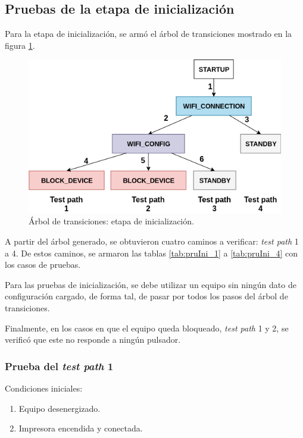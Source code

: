 \subsection{Pruebas de la etapa de inicialización}

Para la etapa de inicialización, se armó el árbol de transiciones mostrado en la figura \ref{fig:ArTrans_1}.

\begin{figure}[htpb]
	\centering
	\includegraphics[scale=1]{./Figures/ArTrans_1.png}
	\caption{Árbol de transiciones: etapa de inicialización.}
	\label{fig:ArTrans_1}
\end{figure}

A partir del árbol generado, se obtuvieron cuatro caminos a verificar: \textit{test path} 1 a 4. De estos caminos, se armaron las tablas \ref{tab:pruIni_1} a \ref{tab:pruIni_4} con los casos de pruebas.

Para las pruebas de inicialización, se debe utilizar un equipo sin ningún dato de configuración cargado, de forma tal, de pasar por todos los pasos del árbol de transiciones.

Finalmente, en los casos en que el equipo queda bloqueado, \textit{test path} 1 y 2, se verificó que este no responde a ningún pulsador.

\subsubsection{Prueba del \textit{test path} 1}
\label{subsubsec:pruIni_1}

Condiciones iniciales: 

\begin{enumerate}
	\item Equipo desenergizado.
	\item Impresora encendida y conectada.
\end{enumerate}

